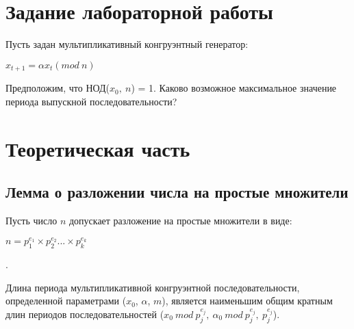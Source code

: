 \documentclass[bachelor, och, labwork]{shiza}
\begin{document}
\title{}





\author{Никитина Арсения Владимировича}




\date{2022}

\maketitle



\tableofcontents





\section{Задание лабораторной работы}
Пусть задан мультипликативный конгруэнтный генератор:

\begin{center}
$x_{t+1} = \alpha x_t(mod ~n)$
\end{center}

Предположим, что НОД($x_0, ~n$) = 1. Каково возможное максимальное значение 
периода выпускной последовательности?


\section{Теоретическая часть}

\subsection{Лемма о разложении числа на простые множители}

Пусть число $n$ допускает разложение на простые множители в виде:

\begin{center} $n=p_1^{e_1}\times p_2^{e_2}...\times p_k^{e_k}$\end{center}.

Длина периода мультипликативной конгруэнтной последовательности, определенной
параметрами ($x_0$, $\alpha$, $m$), является наименьшим общим кратным длин периодов
последовательностей ($x_0 ~mod~p_j^{e_j}, ~\alpha_0 ~mod~p_j^{e_j}, ~p_j^{e_j}$).
\end{document}
